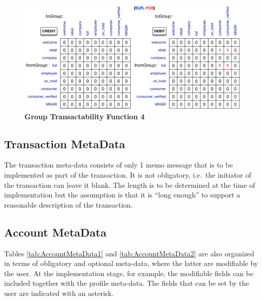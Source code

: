 \begin{figure}[H]
\centering
\includegraphics[width=17.5cm]{Figures/GTF4}
\caption{\small\textbf{Group Transactability Function 4}}
\label{fig:GTF4}
\end{figure}


\subsection{Transaction MetaData}

The transaction meta-data consists of only 1 memo message that is to be implemented as part of the transaction. It is not obligatory, i.e.\ the initiator of the transaction can leave it blank. The length is to be determined at the time of implementation but the assumption is that it is ``long enough'' to support a reasonable description of the transaction.

\newpage

\subsection{Account MetaData}
Tables \ref{tab:AccountMetaData1} and \ref{tab:AccountMetaData2} are also organized in terms of obligatory and optional meta-data, where the latter are modifiable by the user. At the implementation stage, for example, the modifiable fields can be included together with the profile meta-data. The fields that can be set by the user are indicated with an asterisk.

